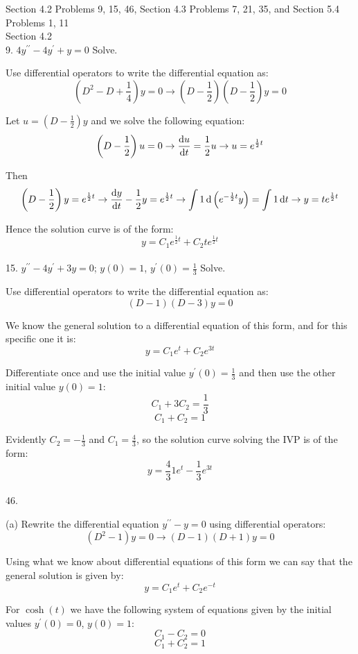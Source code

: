 \documentclass[11pt]{article}
\newcommand{\br}[1]{\left(#1\right)}
\newcommand{\dprime}{\prime\prime}
\begin{document}
Section 4.2 Problems 9, 15, 46, Section 4.3 Problems 7, 21, 35, and Section 5.4 Problems 1, 11\\

Section 4.2 \\

9. $4y^{\dprime}-4y^{\prime}+y = 0$ Solve.

Use differential operators to write the differential equation as:
$$\br{D^2-D+
\frac{1}{4}}y = 0 \to \br{D-\frac{1}{2}}\br{D-\frac{1}{2}}y = 0$$

Let $u = \br{D-\frac{1}{2}}y$ and we solve the following equation:
$$\br{D-\frac{1}{2}}u = 0 \to \dv{u}{t} = \frac{1}{2}u \to u = e^{\frac{1}{2}t}$$

Then
$$\br{D-\frac{1}{2}}y = e^{\frac{1}{2}t} \to \dv{y}{t} - \frac{1}{2}y = e^{\frac{1}{2}t} \to \int 1 \dd{\br{e^{-\frac{1}{2}t}y}} = \int 1 \dd{t} \to y = te^{\frac{1}{2}t}$$

Hence the solution curve is of the form:
$$y = C_1e^{\frac{1}{2}t} + C_2te^{\frac{1}{2}t}$$ \\

15. $y^{\dprime} -4y^{\prime} + 3y = 0$; $y(0) = 1$, $y^{\prime}(0) = \frac{1}{3}$ Solve.

Use differential operators to write the differential equation as:
$$\br{D-1}\br{D-3}y = 0$$

We know the general solution to a differential equation of this form, and for this specific one it is:
$$y = C_1e^t+C_2e^{3t}$$

Differentiate once and use the initial value $y^{\prime}(0) = \frac{1}{3}$ and then use the other initial value $y(0) = 1$:
$$C_1 + 3C_2 = \frac{1}{3}$$
$$C_1 + C_2 = 1$$

Evidently $C_2 = -\frac{1}{3}$ and $C_1 = \frac{4}{3}$, so the solution curve solving the IVP is of the form:
$$y = \frac{4}{3}1e^t-\frac{1}{3}e^{3t}$$ \\

46.

(a) Rewrite the differential equation $y^{\dprime} - y = 0$ using differential operators:
$$\br{D^2-1}y = 0 \to \br{D-1}\br{D+1}y = 0$$

Using what we know about differential equations of this form we can say that the general solution is given by:
$$y = C_1e^t + C_2e^{-t}$$

For $\cosh(t)$ we have the following system of equations given by the initial values $y^{\prime}(0) = 0$, $y(0) = 1$:
$$C_1 - C_2 = 0$$
$$C_1 + C_2 = 1$$
\end{document}
